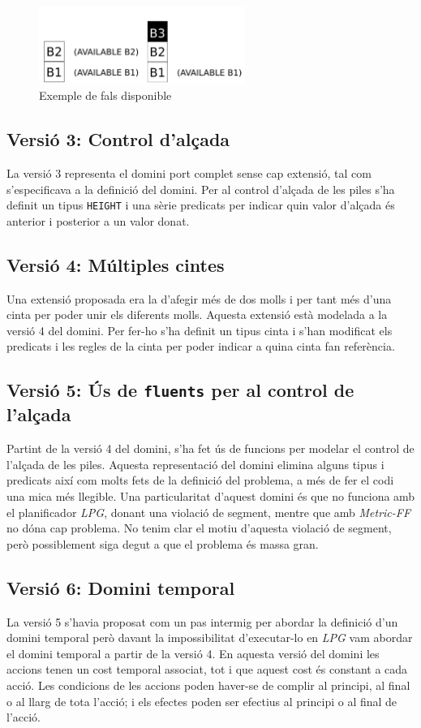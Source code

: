 \documentclass[10pt,a4paper]{article}
\begin{document}
\begin{figure}[h]
\centering
\includegraphics[width=0.6\textwidth]{fake_disp}
\caption{Exemple de fals disponible}
\label{fig:fake_disp}
\end{figure}

\subsection*{Versió 3: Control d'alçada}
La versió 3 representa el domini port complet sense cap extensió, tal
com s'especificava a la definició del domini. Per al control d'alçada 
de les piles s'ha definit un tipus \texttt{HEIGHT} i una sèrie predicats
per indicar quin valor d'alçada és anterior i posterior a un valor donat.

\subsection*{Versió 4: Múltiples cintes}
Una extensió proposada era la d'afegir més de dos molls i per tant més d'una cinta
per poder unir els diferents molls. Aquesta extensió està modelada a la versió 4
del domini. Per fer-ho s'ha definit un tipus cinta i s'han modificat els predicats
i les regles de la cinta per poder indicar a quina cinta fan referència.

\subsection*{Versió 5: Ús de \texttt{fluents} per al control de l'alçada}
Partint de la versió 4 del domini, s'ha fet ús de funcions per modelar el control
de l'alçada de les piles. Aquesta representació del domini elimina alguns tipus 
i predicats així com molts fets de la definició del problema, a més de fer el codi
una mica més llegible. Una particularitat d'aquest domini és que no funciona amb
el planificador \textit{LPG}, donant una violació de segment, mentre que amb
\textit{Metric-FF} no dóna cap problema. No tenim clar el motiu d'aquesta violació
de segment, però possiblement siga degut a que el problema és massa gran.

\subsection*{Versió 6: Domini temporal}
La versió 5 s'havia proposat com un pas intermig per abordar la definició d'un domini temporal
però davant la impossibilitat d'executar-lo en \textit{LPG} vam abordar el domini temporal
a partir de la versió 4. En aquesta versió del domini les accions tenen un cost temporal
associat, tot i que aquest cost és constant a cada acció. Les condicions de les accions poden
haver-se de complir al principi, al final o al llarg de tota l'acció; i els efectes poden
ser efectius al principi o al final de l'acció.
\end{document}
